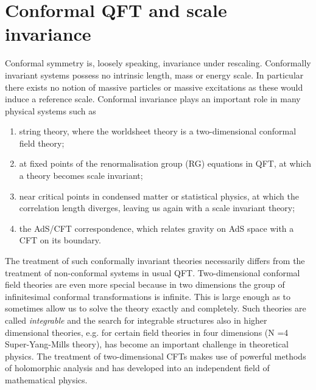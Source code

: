 \chapter{Conformal QFT and scale invariance}
Conformal symmetry is, loosely speaking, invariance under rescaling. Conformally invariant
systems possess no intrinsic length, mass or energy scale. In particular there exists no notion of
massive particles or massive excitations as these would induce a reference scale.
Conformal invariance plays an important role in many physical systems such as
\begin{enumerate} 
\item  string theory, where the worldsheet theory is a two-dimensional conformal field theory;
\item at fixed points of the renormalisation group (RG) equations in QFT, at which a theory
becomes scale invariant;
\item  near critical points in condensed matter or statistical physics, at which the correlation
length diverges, leaving us again with a scale invariant theory;
\item the AdS/CFT correspondence, which relates gravity on AdS space with a CFT on its
boundary.
\end{enumerate}
The treatment of such conformally invariant theories necessarily differs from the treatment of
non-conformal systems in usual QFT. Two-dimensional conformal field theories are even more
special because in two dimensions the group of infinitesimal conformal transformations is infinite.
This is large enough as to sometimes allow us to solve the theory exactly and completely. Such
theories are called \emph{integrable} and the search for integrable structures also in higher dimensional
theories, e.g. for certain field theories in four dimensions (N =4 Super-Yang-Mills theory), has
become an important challenge in theoretical physics. The treatment of two-dimensional CFTs
makes use of powerful methods of holomorphic analysis and has developed into an independent
field of mathematical physics.
